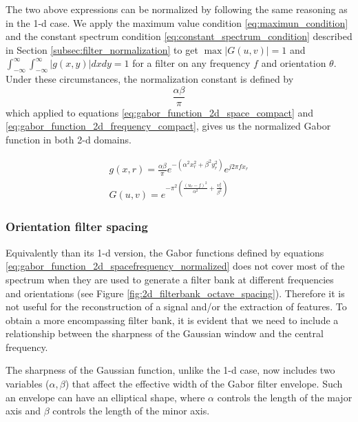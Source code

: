 The two above expressions can be normalized by following the same reasoning as in the 1-d case. We apply the maximum value condition \eqref{eq:maximun_condition} and the constant spectrum condition \eqref{eq:constant_spectrum_condition} described in Section \ref{subsec:filter_normalization} to get $\max{|G(u,v)|} = 1$ and $\int_{-\infty}^{\infty} \int_{-\infty}^{\infty} |g(x,y)| dx dy = 1$ for a filter on any frequency $f$ and orientation $\theta$. 
Under these circumstances, the normalization constant is defined by
\begin{equation}\label{eq:normalization_constant_2d}
    \frac{\alpha \beta}{\pi}
\end{equation}
which applied to equations \eqref{eq:gabor_function_2d_space_compact}  and \eqref{eq:gabor_function_2d_frequency_compact}, gives us the normalized Gabor function in both 2-d domains. 

\begin{equation}\label{eq:gabor_function_2d_spacefrequency_normalized}
    \begin{gathered}
        g(x, r) = \frac{\alpha \beta}{\pi} e ^{-\left(\alpha^2 x_r^2 + \beta^2 y_r^2\right)} e ^{j 2 \pi f x_r } \\
        G(u, v) =   e ^{- \pi^2 \left(\frac{\left( u_r - f\right)^2}{\alpha^2} + \frac{v_r^2}{\beta^2}\right)} 
     \end{gathered}
\end{equation}

\subsubsection{Orientation filter spacing}

Equivalently than its 1-d version, the Gabor functions defined by equations \eqref{eq:gabor_function_2d_spacefrequency_normalized} does not cover most of the spectrum when they are used to generate a filter bank at different frequencies and orientations (see Figure \ref{fig:2d_filterbank_octave_spacing}). Therefore it is not useful for the reconstruction of a signal and/or the extraction of features. To obtain a more encompassing filter bank, it is evident that we need to include a relationship between the sharpness of the Gaussian window and the central frequency. 

The sharpness of the Gaussian function, unlike the 1-d case, now includes two variables ($\alpha, \beta$) that affect the effective width of the Gabor filter envelope. Such an envelope can have an elliptical shape, where $\alpha $ controls the length of the major axis and $\beta$ controls the length of the minor axis. 

